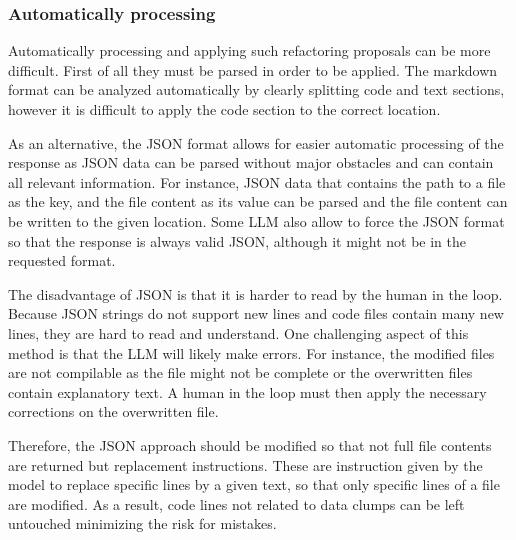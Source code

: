 \subsubsection{Automatically processing}

Automatically processing and applying such refactoring proposals can be more difficult.
First of all they must be parsed in order to be applied. The markdown format can be analyzed automatically by clearly splitting code and text sections, however it is difficult to apply the code section to the correct location. 

As an alternative, the \ac{JSON} format allows for easier automatic processing of the response as \ac{JSON} data can be parsed without major obstacles and can contain all relevant information. For instance, \ac{JSON} data that contains the path to a file as the key, and the file content as its value can be parsed and the file content can be written to the given location. Some \acs{LLM} also allow to force the \ac{JSON} format so that the response is always valid \ac{JSON}, although it might not be in the requested format. 

The disadvantage of \ac{JSON} is that it is harder to read by the human in the loop. Because JSON strings do not support new lines and code files contain many new lines, they are hard to read and understand.
One challenging aspect of this method is that the \ac{LLM} will likely make errors. For instance, the modified files are not compilable as the file might not be complete or the  overwritten files contain explanatory text. A human in the loop must then apply the necessary corrections on the overwritten file.



Therefore, the \ac{JSON} approach should be modified so that not full file contents are returned but replacement instructions. These are instruction given by the model to replace specific lines by a given text, so that only specific lines of a file are modified.  As a result, code lines not related to data clumps can be left untouched minimizing the risk for mistakes. 



